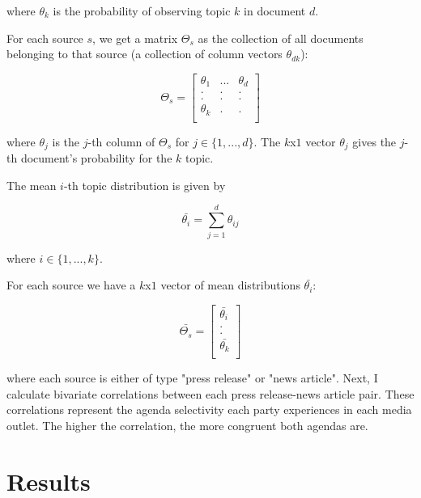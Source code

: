\documentclass[12pt,a4paper,notitlepage]{article}
\begin{document}
where $\theta_k$ is the probability of observing topic $k$ in document $d$.

For each source $s$, we get a matrix $\Theta_s$ as the collection of all documents belonging to that source (a collection of column vectors $\theta_{dk}$):

\begin{equation}
	\Theta_s =
	\begin{bmatrix} 
	\theta_{1} & ... & \theta_{d} \\
	. & . & . \\
	. & . & . \\
	\theta_{k} & . & . \\
	\end{bmatrix}
\end{equation} 

where $\theta_{j}$ is the $j$-th column of $\Theta_s$ for $j \in \{1, ... , d \} $. The $k$x$1$ vector $\theta_j$ gives the $j$-th document's probability for the $k$ topic.

The mean $i$-th topic distribution is given by

\begin{equation}
	\bar{ \theta_{i} } = \sum^d_{j=1}\theta_{ij}
\end{equation}

where $i \in \{1, ... , k \} $.

For each source we have a $k$x$1$ vector of mean distributions $\bar{ \theta_{i} }$:

\begin{equation}
	\bar{ \Theta_s } =
	\begin{bmatrix} 
	\bar{ \theta_{i} } \\
	. \\
	. \\
	\bar{ \theta_{k} } \\
	\end{bmatrix}
\end{equation} 

where each source is either of type "press release" or "news article". Next, I calculate bivariate correlations between each press release-news article pair. These correlations represent the agenda selectivity each party experiences in each media outlet. The higher the correlation, the more congruent both agendas are.


\section{Results}
\end{document}
